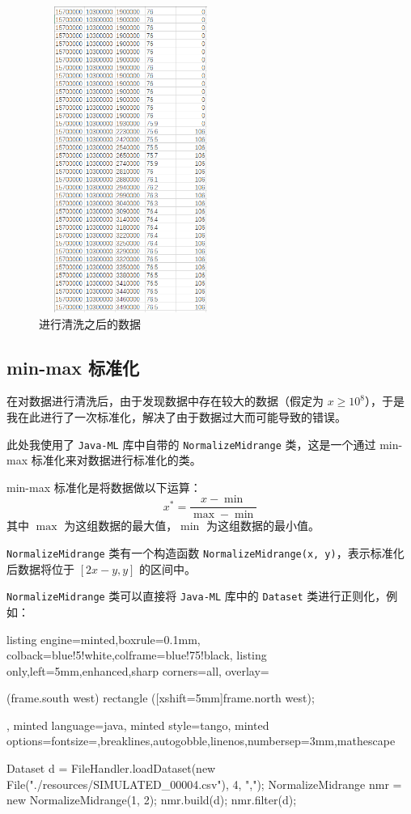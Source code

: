 \documentclass[a4paper, 11pt, cn]{elegantpaper}
\begin{document}
\begin{figure}[htbp]
    \centering
    \includegraphics[height=10cm, width=6cm]{../resources/After_Cleaning.png}
    \caption{进行清洗之后的数据}
\end{figure}
\subsection{min-max 标准化}
在对数据进行清洗后，由于发现数据中存在较大的数据（假定为 $x \geq 10^8$），于是我在此进行了一次标准化，解决了由于数据过大而可能导致的错误。

此处我使用了 \texttt{Java-ML} 库中自带的 \texttt{NormalizeMidrange} 类，这是一个通过 min-max 标准化来对数据进行标准化的类。

min-max 标准化是将数据做以下运算：$$x^*=\dfrac{x - \min}{\max - \min}$$ 其中 $\max$ 为这组数据的最大值，$\min$ 为这组数据的最小值。

\texttt{NormalizeMidrange} 类有一个构造函数 \texttt{NormalizeMidrange(x, y)}，表示标准化后数据将位于 $[2x-y, y]$ 的区间中。

\texttt{NormalizeMidrange} 类可以直接将 \texttt{Java-ML} 库中的 \texttt{Dataset} 类进行正则化，例如：
\begin{tcblisting}{listing engine=minted,boxrule=0.1mm,
    colback=blue!5!white,colframe=blue!75!black,
    listing only,left=5mm,enhanced,sharp corners=all,
    overlay={\begin{tcbclipinterior} (frame.south west)
    rectangle ([xshift=5mm]frame.north west);\end{tcbclipinterior}},
    minted language=java,
    minted style=tango,
    minted options={fontsize=\small,breaklines,autogobble,linenos,numbersep=3mm,mathescape}}
Dataset d = FileHandler.loadDataset(new File("./resources/SIMULATED_00004.csv"), 4, ",");
NormalizeMidrange nmr = new NormalizeMidrange(1, 2);
nmr.build(d);
nmr.filter(d);
\end{tcblisting}
\end{document}
